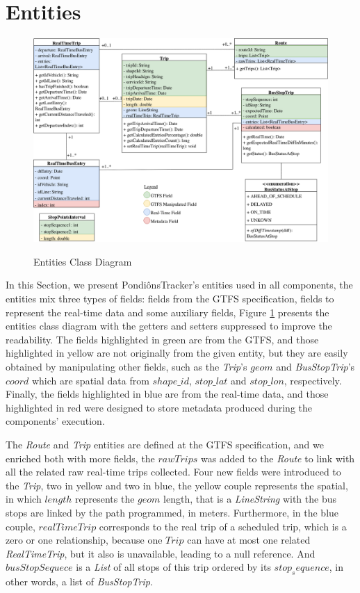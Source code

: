 \section{Entities}
\begin{figure}[h]
     \centering
        \caption{Entities Class Diagram}
        \includegraphics[width=\textwidth]{imagem/cap4/entitiesCD.png}
        \label{cdEntities}
\end{figure}

In this Section, we present PondiônsTracker's entities used in all components, the entities
mix three types of fields: fields from the GTFS specification, fields to represent the 
real-time data and some auxiliary fields, Figure \ref{cdEntities} presents the entities 
class diagram with the getters and setters suppressed to improve the readability.
The fields highlighted in green are from the GTFS, and those highlighted in yellow are not originally from the given entity, but they are easily obtained by 
manipulating other fields, such as the \textit{Trip}'s $geom$ and \textit{BusStopTrip}'s
$coord$ which are spatial data from $shape\_id$, $stop\_lat$ and $stop\_lon$, respectively.
Finally, the fields highlighted in blue are from the real-time data,
and those highlighted in red were designed to store metadata produced during the components' execution.


The \textit{Route} and \textit{Trip} entities are defined at the GTFS specification, 
and we enriched both with more fields, the $rawTrips$ 
was added to the \textit{Route} to link with all the related raw 
real-time trips collected. Four new fields were introduced to the 
\textit{Trip}, two in yellow and two in blue, the yellow couple represents the spatial, 
in which $length$ represents the $geom$ length, that is a \textit{LineString} with
the bus stops are linked by the path programmed, in meters. Furthermore, in the blue couple,
$realTimeTrip$ corresponds to the real trip of a scheduled trip, which is a zero or one 
relationship, because
one $Trip$ can have at most one related \textit{RealTimeTrip}, but it also is unavailable, leading to a null reference. 
And $busStopSequece$ is a \textit{List} of all stops of this trip ordered by its $stop_sequence$, in other 
words, a list of \textit{BusStopTrip}.

